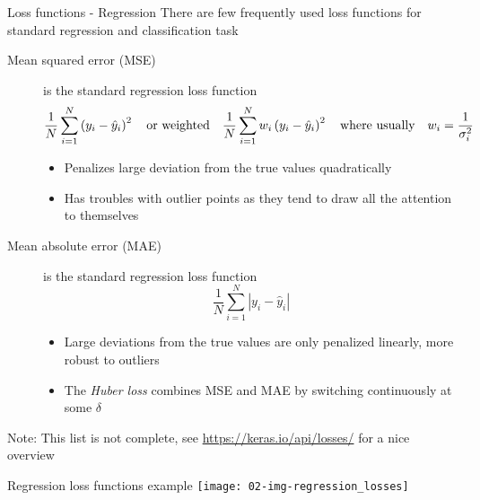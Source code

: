     \begin{frame}{Loss functions - Regression}
      \enlargethispage{1cm}
      There are few frequently used loss functions for standard regression and classification task
      \begin{description}
        \item[Mean squared error (MSE)] is the standard regression loss function
          \begin{equation*}
            \frac{1}{N} \sum_{i=1}^N \left(y_i - \hat{y}_i\right)^2
            \quad\text{or weighted}\quad
            \frac{1}{N} \sum_{i=1}^N w_i\left(y_i - \hat{y}_i\right)^2
            \quad\text{where usually}\quad
            w_i = \frac{1}{\sigma_i^2}
          \end{equation*}
          \begin{itemize}
            \item Penalizes large deviation from the true values quadratically
            \item Has troubles with outlier points as they tend to draw all the attention to themselves
          \end{itemize}
        \item[Mean absolute error (MAE)] is the standard regression loss function
          \begin{equation*}
            \frac{1}{N} \sum_{i=1}^N \left|y_i - \hat{y}_i\right|
          \end{equation*}
          \begin{itemize}
            \item Large deviations from the true values are only penalized linearly, more robust to outliers
            \item The \emph{Huber loss} combines MSE and MAE by switching continuously at some $\delta$
          \end{itemize}
      \end{description}
      Note: This list is not complete, see \url{https://keras.io/api/losses/} for a nice overview
    \end{frame}

    \begin{frame}{Regression loss functions example}
        \texttt{[image: 02-img-regression\_losses]}
    \end{frame}

